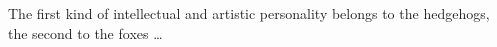 \documentclass[a4paper,twoside]{ociamthesis}
\newcommand*{\bibtitle}{References}
\begin{document}
\begin{romanpages}
\tableofcontents

\listoffigures
	\mtcaddchapter




\end{romanpages}


\flushbottom




\startappendices




\begin{savequote}[8cm]
The first kind of intellectual and artistic personality belongs to the hedgehogs, the second to the foxes \dots
\end{savequote}

\setlength{\baselineskip}{0pt} %

{\renewcommand*\MakeUppercase[1]{#1}%
\printbibliography[heading=bibintoc,title={\bibtitle}]}
\end{document}
